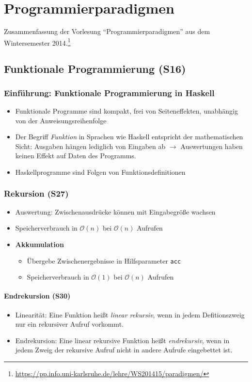 \chapter{Programmierparadigmen}

Zusammenfassung der Vorlesung "`Programmierparadigmen"' aus dem Wintersemester 2014.\footnote{\url{https://pp.info.uni-karlsruhe.de/lehre/WS201415/paradigmen/}}

\section{Funktionale Programmierung (S16)}

\subsection{Einführung: Funktionale Programmierung in Haskell}
\begin{itemize}
	\item Funktionale Programme sind kompakt, frei von Seiteneffekten, unabhängig von der Anweisungsreihenfolge
	\item Der Begriff \textit{Funktion} in Sprachen wie Haskell entspricht der mathematischen Sicht: Ausgaben hängen lediglich von Eingaben ab \(\rightarrow\) Auswertungen haben keinen Effekt auf Daten des Programms.
	\item Haskellprogramme sind Folgen von Funktionsdefinitionen
\end{itemize}

\subsection{Rekursion (S27)}
\begin{itemize}
	\item Auswertung: Zwischenausdrücke können mit Eingabegröße wachsen
	\item Speicherverbrauch in \(\mathcal{O}(n)\) bei \(\mathcal{O}(n)\) Aufrufen
	\item \textbf{Akkumulation}
	\begin{itemize}
		\item Übergebe Zwischenergebnisse in Hilfsparameter \texttt{acc}
		\item Speicherverbrauch in \(\mathcal{O}(1)\) bei \(\mathcal{O}(n)\) Aufrufen
	\end{itemize}
\end{itemize}

\subsubsection{Endrekursion (S30)}
\begin{itemize}
	\item Linearität: Eine Funktion heißt \textit{linear rekursiv}, wenn in jedem Defitionszweig nur ein rekursiver Aufruf vorkommt.
	\item Endrekursion: Eine linear rekursive Funktion heißt \textit{endrekursiv}, wenn in jedem Zweig der rekursive Aufruf nicht in andere Aufrufe eingebettet ist.
\end{itemize}


